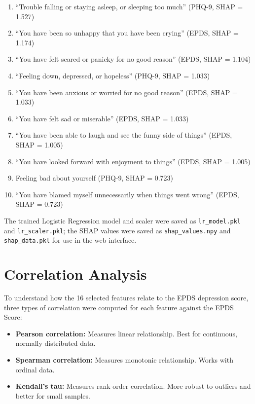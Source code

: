 \begin{enumerate}
    \item ``Trouble falling or staying asleep, or sleeping too much'' (PHQ-9, SHAP = 1.527)
    \item ``You have been so unhappy that you have been crying'' (EPDS, SHAP = 1.174)
    \item ``You have felt scared or panicky for no good reason'' (EPDS, SHAP = 1.104)
    \item ``Feeling down, depressed, or hopeless'' (PHQ-9, SHAP = 1.033)
    \item ``You have been anxious or worried for no good reason'' (EPDS, SHAP = 1.033)
    \item ``You have felt sad or miserable'' (EPDS, SHAP = 1.033)
    \item ``You have been able to laugh and see the funny side of things'' (EPDS, SHAP = 1.005)
    \item ``You have looked forward with enjoyment to things'' (EPDS, SHAP = 1.005)
    \item Feeling bad about yourself (PHQ-9, SHAP = 0.723)
    \item ``You have blamed myself unnecessarily when things went wrong'' (EPDS, SHAP = 0.723)
\end{enumerate}

The trained Logistic Regression model and scaler were saved as \texttt{lr\_model.pkl} and \texttt{lr\_scaler.pkl}; the SHAP values were saved as \texttt{shap\_values.npy} and \texttt{shap\_data.pkl} for use in the web interface.

\section{Correlation Analysis}
\label{ch3-sec-correlation}

To understand how the 16 selected features relate to the EPDS depression score, three types of correlation were computed for each feature against the EPDS Score:

\begin{itemize}
    \item \textbf{Pearson correlation:} Measures linear relationship. Best for continuous, normally distributed data.
    \item \textbf{Spearman correlation:} Measures monotonic relationship. Works with ordinal data.
    \item \textbf{Kendall's tau:} Measures rank-order correlation. More robust to outliers and better for small samples.
\end{itemize}

